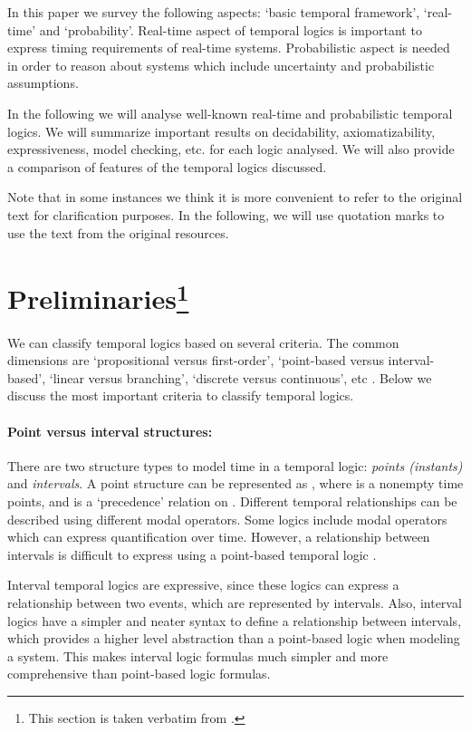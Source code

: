 \documentclass[11pt]{article}
\begin{document}
In this paper we survey the following aspects: `basic temporal framework', `real-time' and `probability'. Real-time aspect of temporal logics is important to express timing requirements of real-time systems. Probabilistic aspect is needed in order to reason about systems which include uncertainty and probabilistic assumptions. 

In the following we will analyse well-known real-time and probabilistic temporal logics. We will summarize important results on decidability, axiomatizability, expressiveness, model checking, etc. for each logic analysed. We will also provide a comparison of features of the temporal logics discussed.  

Note that in some instances we think it is more convenient to refer to the original text for clarification purposes. In the following,  we will use quotation marks to use the text from the original resources. 


\section[Pre]{Preliminaries\footnote{This section is taken verbatim from \cite{Kon10}.}} \label{sec:Classification-of-Temporal}

We can classify temporal logics based on several criteria. The common dimensions are `propositional versus first-order', `point-based versus interval-based', `linear versus branching', `discrete versus continuous', etc \cite{Eme95,Ven98,BMN00}. Below we discuss the most important  criteria to classify temporal logics.

\paragraph{Point versus interval structures:} There are two structure types to model time in a  temporal logic: \emph{points (instants)} and \emph{intervals}. A point structure   can be represented as , where  is a nonempty time points, and  is a `precedence' relation on . Different temporal relationships can be described using different modal operators. Some logics include modal operators  which can express quantification over time. However, a relationship between intervals is difficult to express using a point-based temporal logic \cite{FM94}. 

Interval temporal logics are expressive, since these logics can express a relationship between two events, which are represented by intervals. Also, interval logics \cite{SMS82,SMV83,Mos83,Lad87,MS87,RG89,HS91} have a simpler and neater syntax to define a relationship between intervals, which provides a higher level abstraction than a point-based logic when modeling a system. This makes interval logic formulas much simpler and more comprehensive than point-based logic formulas. 
\end{document}
